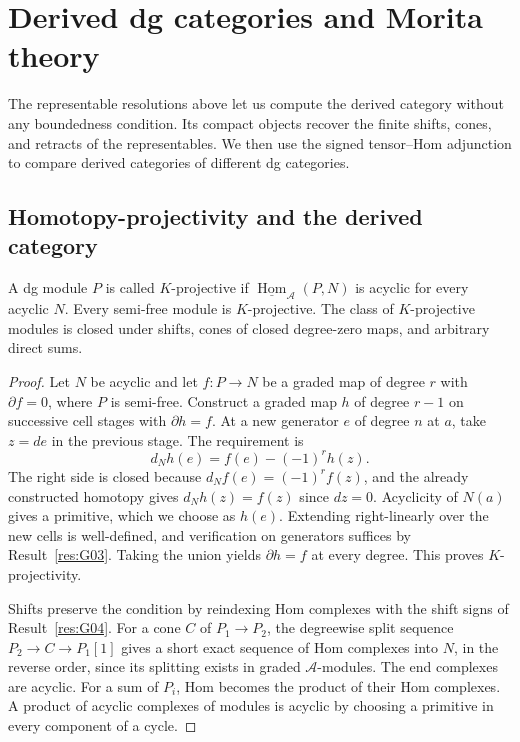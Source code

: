 \chapter{Derived dg categories and Morita theory}
\label{ch:dg-categories}

The representable resolutions above let us compute the derived
category without any boundedness condition. Its compact objects
recover the finite shifts, cones, and retracts of the representables.
We then use the signed tensor--Hom adjunction to compare derived
categories of different dg categories.

\section{Homotopy-projectivity and the derived category}

\begin{theorem}\label{res:G07}
A dg module \(P\) is called \(K\)-projective if
\(\underline{\operatorname{Hom}}_{\mathcal A}(P,N)\) is acyclic for
every acyclic \(N\). Every semi-free module is \(K\)-projective.
The class of \(K\)-projective modules is closed under shifts,
cones of closed degree-zero maps, and arbitrary direct sums.
\end{theorem}
\begin{proof}
Let \(N\) be acyclic and let \(f:P\to N\) be a graded map of
degree \(r\) with \(\partial f=0\), where \(P\) is semi-free.
Construct a graded map \(h\) of degree \(r-1\) on successive
cell stages with \(\partial h=f\). At a new generator \(e\)
of degree \(n\) at \(a\), take \(z=de\) in the previous stage.
The requirement is
\[
          d_N h(e)= f(e)-(-1)^r h(z).
\]
The right side is closed because
\(d_N f(e)=(-1)^r f(z)\), and the already constructed homotopy
gives \(d_N h(z)=f(z)\) since \(dz=0\). Acyclicity of \(N(a)\)
gives a primitive, which we choose as \(h(e)\). Extending
right-linearly over the new cells is well-defined, and verification
on generators suffices by Result~\ref{res:G03}. Taking the union yields
\(\partial h=f\) at every degree. This proves \(K\)-projectivity.

Shifts preserve the condition by reindexing Hom complexes with
the shift signs of Result~\ref{res:G04}. For a cone \(C\) of
\(P_1\to P_2\), the degreewise split sequence
\(P_2\to C\to P_1[1]\) gives a short exact sequence of Hom complexes
into \(N\), in the reverse order, since its splitting exists
in graded \(\mathcal A\)-modules. The end complexes are acyclic.
For a sum of \(P_i\), Hom becomes the product of their Hom
complexes. A product of acyclic complexes of modules is acyclic
by choosing a primitive in every component of a cycle.
\end{proof}


